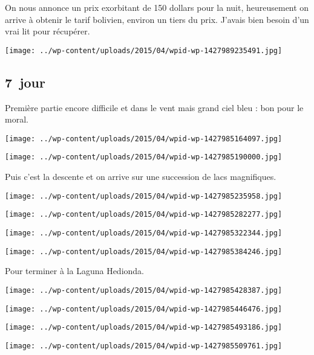   On nous annonce un prix exorbitant de 150 dollars pour la nuit, heureusement on arrive à obtenir le tarif bolivien, environ un tiers du prix. J'avais bien besoin d'un vrai lit pour récupérer.
\begin{center} \texttt{[image: ../wp-content/uploads/2015/04/wpid-wp-1427989235491.jpg]} \end{center}

 \subsection*{7\ieme\ jour} 

 Première partie encore difficile et dans le vent mais grand ciel bleu : bon pour le moral.
\begin{center} \texttt{[image: ../wp-content/uploads/2015/04/wpid-wp-1427985164097.jpg]} \end{center}
\begin{center} \texttt{[image: ../wp-content/uploads/2015/04/wpid-wp-1427985190000.jpg]} \end{center}

  Puis c'est la descente et on arrive sur une succession de lacs magnifiques.
\begin{center} \texttt{[image: ../wp-content/uploads/2015/04/wpid-wp-1427985235958.jpg]} \end{center}
\begin{center} \texttt{[image: ../wp-content/uploads/2015/04/wpid-wp-1427985282277.jpg]} \end{center}
\begin{center} \texttt{[image: ../wp-content/uploads/2015/04/wpid-wp-1427985322344.jpg]} \end{center}
\begin{center} \texttt{[image: ../wp-content/uploads/2015/04/wpid-wp-1427985384246.jpg]} \end{center}

 Pour terminer à la Laguna Hedionda.
\begin{center} \texttt{[image: ../wp-content/uploads/2015/04/wpid-wp-1427985428387.jpg]} \end{center}
\begin{center} \texttt{[image: ../wp-content/uploads/2015/04/wpid-wp-1427985446476.jpg]} \end{center}
\begin{center} \texttt{[image: ../wp-content/uploads/2015/04/wpid-wp-1427985493186.jpg]} \end{center}
\begin{center} \texttt{[image: ../wp-content/uploads/2015/04/wpid-wp-1427985509761.jpg]} \end{center}

